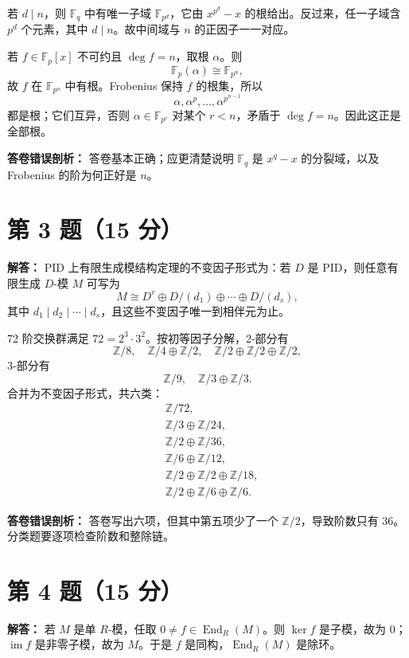 \documentclass[11pt]{article}
\begin{document}
若 \(d\mid n\)，则 \(\mathbb F_q\) 中有唯一子域 \(\mathbb F_{p^d}\)，它由 \(x^{p^d}-x\) 的根给出。反过来，任一子域含 \(p^d\) 个元素，其中 \(d\mid n\)。故中间域与 \(n\) 的正因子一一对应。

若 \(f\in\mathbb F_p[x]\) 不可约且 \(\deg f=n\)，取根 \(\alpha\)。则
\[
  \mathbb F_p(\alpha)\cong \mathbb F_{p^n},
\]
故 \(f\) 在 \(\mathbb F_{p^n}\) 中有根。Frobenius 保持 \(f\) 的根集，所以
\[
  \alpha,\alpha^p,\ldots,\alpha^{p^{n-1}}
\]
都是根；它们互异，否则 \(\alpha\in\mathbb F_{p^r}\) 对某个 \(r<n\)，矛盾于 \(\deg f=n\)。因此这正是全部根。

\textbf{答卷错误剖析：}
答卷基本正确；应更清楚说明 \(\mathbb F_q\) 是 \(x^q-x\) 的分裂域，以及 Frobenius 的阶为何正好是 \(n\)。

\section*{第 3 题（15 分）}

\textbf{解答：}
PID 上有限生成模结构定理的不变因子形式为：若 \(D\) 是 PID，则任意有限生成 \(D\)-模 \(M\) 可写为
\[
  M\cong D^r\oplus D/(d_1)\oplus\cdots\oplus D/(d_s),
\]
其中 \(d_1\mid d_2\mid\cdots\mid d_s\)，且这些不变因子唯一到相伴元为止。

72 阶交换群满足 \(72=2^3\cdot3^2\)。按初等因子分解，2-部分有
\[
  \mathbb Z/8,\quad \mathbb Z/4\oplus\mathbb Z/2,\quad
  \mathbb Z/2\oplus\mathbb Z/2\oplus\mathbb Z/2,
\]
3-部分有
\[
  \mathbb Z/9,\quad \mathbb Z/3\oplus\mathbb Z/3.
\]
合并为不变因子形式，共六类：
\[
\begin{aligned}
&\mathbb Z/72,\\
&\mathbb Z/3\oplus\mathbb Z/24,\\
&\mathbb Z/2\oplus\mathbb Z/36,\\
&\mathbb Z/6\oplus\mathbb Z/12,\\
&\mathbb Z/2\oplus\mathbb Z/2\oplus\mathbb Z/18,\\
&\mathbb Z/2\oplus\mathbb Z/6\oplus\mathbb Z/6.
\end{aligned}
\]

\textbf{答卷错误剖析：}
答卷写出六项，但其中第五项少了一个 \(\mathbb Z/2\)，导致阶数只有 \(36\)。分类题要逐项检查阶数和整除链。

\section*{第 4 题（15 分）}

\textbf{解答：}
若 \(M\) 是单 \(R\)-模，任取 \(0\neq f\in\operatorname{End}_R(M)\)。则 \(\ker f\) 是子模，故为 \(0\)；\(\operatorname{im}f\) 是非零子模，故为 \(M\)。于是 \(f\) 是同构，\(\operatorname{End}_R(M)\) 是除环。
\end{document}
